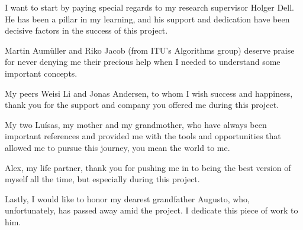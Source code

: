 
I want to start by paying special regards to my research supervisor Holger Dell. He has been a pillar in my learning, and his support and dedication have been decisive factors in the success of this project.

Martin Aumüller and Riko Jacob (from ITU's Algorithms group) deserve praise for never denying me their precious help when I needed to understand some important concepts.

My peers Weisi Li and Jonas Andersen, to whom I wish success and happiness, thank you for the support and company you offered me during this project.

My two Luísas, my mother and my grandmother, who have always been important references and provided me with the tools and opportunities that allowed me to pursue this journey, you mean the world to me.

Alex, my life partner, thank you for pushing me in to being the best version of myself all the time, but especially during this project.

Lastly, I would like to honor my dearest grandfather Augusto, who, unfortunately, has passed away amid the project. I dedicate this piece of work to him.